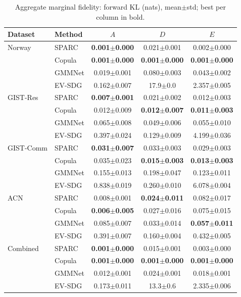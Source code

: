 \documentclass[journal]{IEEEtran}
\begin{document}
\begin{table}[t]
\centering
\caption{Aggregate marginal fidelity: forward KL (nats), mean$\pm$std; best per column in bold.}
\label{tab:benchmark}
\setlength{\tabcolsep}{4pt}
\footnotesize
\begin{tabular}{llccc}
\toprule
Dataset & Method & $A$ & $D$ & $E$ \\
\midrule
Norway & SPARC & \textbf{0.001$\pm$0.000} & 0.021$\pm$0.001 & 0.002$\pm$0.000 \\
 & Copula & \textbf{0.001$\pm$0.000} & \textbf{0.001$\pm$0.000} & \textbf{0.001$\pm$0.000} \\
 & GMMNet & 0.019$\pm$0.001 & 0.080$\pm$0.003 & 0.043$\pm$0.002 \\
 & EV-SDG & 0.162$\pm$0.007 & 17.9$\pm$0.0 & 2.357$\pm$0.005 \\
\midrule
GIST-Res & SPARC & \textbf{0.007$\pm$0.001} & 0.021$\pm$0.002 & 0.012$\pm$0.003 \\
 & Copula & 0.012$\pm$0.009 & \textbf{0.012$\pm$0.007} & \textbf{0.011$\pm$0.003} \\
 & GMMNet & 0.065$\pm$0.008 & 0.049$\pm$0.006 & 0.055$\pm$0.010 \\
 & EV-SDG & 0.397$\pm$0.024 & 0.129$\pm$0.009 & 4.199$\pm$0.036 \\
\midrule
GIST-Comm & SPARC & \textbf{0.031$\pm$0.007} & 0.033$\pm$0.003 & 0.029$\pm$0.003 \\
 & Copula & 0.035$\pm$0.023 & \textbf{0.015$\pm$0.003} & \textbf{0.013$\pm$0.003} \\
 & GMMNet & 0.155$\pm$0.013 & 0.198$\pm$0.047 & 0.123$\pm$0.011 \\
 & EV-SDG & 0.838$\pm$0.019 & 0.260$\pm$0.010 & 6.078$\pm$0.004 \\
\midrule
ACN & SPARC & 0.008$\pm$0.001 & \textbf{0.024$\pm$0.011} & 0.082$\pm$0.017 \\
 & Copula & \textbf{0.006$\pm$0.005} & 0.027$\pm$0.016 & 0.075$\pm$0.015 \\
 & GMMNet & 0.085$\pm$0.007 & 0.033$\pm$0.014 & \textbf{0.057$\pm$0.011} \\
 & EV-SDG & 0.391$\pm$0.007 & 0.160$\pm$0.004 & 0.432$\pm$0.005 \\
\midrule
Combined & SPARC & \textbf{0.001$\pm$0.000} & 0.015$\pm$0.001 & 0.003$\pm$0.000 \\
 & Copula & \textbf{0.001$\pm$0.000} & \textbf{0.001$\pm$0.000} & \textbf{0.001$\pm$0.000} \\
 & GMMNet & 0.012$\pm$0.001 & 0.024$\pm$0.001 & 0.018$\pm$0.001 \\
 & EV-SDG & 0.173$\pm$0.011 & 13.3$\pm$0.6 & 2.335$\pm$0.006 \\
\bottomrule
\end{tabular}
\end{table}
\end{document}
